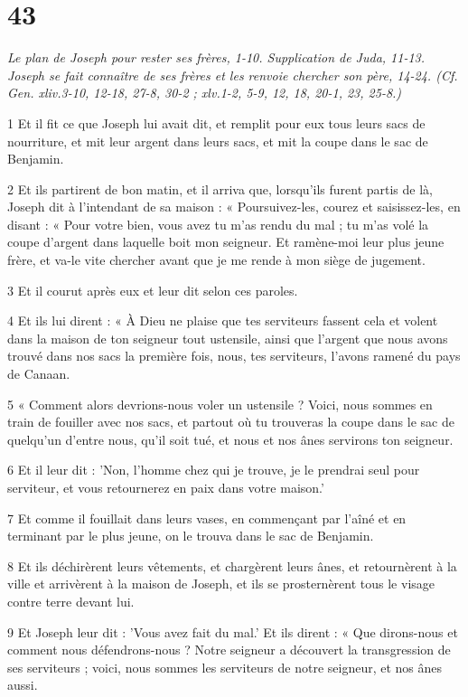 \chapter{43}

\par \textit{Le plan de Joseph pour rester ses frères, 1-10. Supplication de Juda, 11-13. Joseph se fait connaître de ses frères et les renvoie chercher son père, 14-24. (Cf. Gen. xliv.3-10, 12-18, 27-8, 30-2 ; xlv.1-2, 5-9, 12, 18, 20-1, 23, 25-8.)}

\par 1 Et il fit ce que Joseph lui avait dit, et remplit pour eux tous leurs sacs de nourriture, et mit leur argent dans leurs sacs, et mit la coupe dans le sac de Benjamin.
\par 2 Et ils partirent de bon matin, et il arriva que, lorsqu'ils furent partis de là, Joseph dit à l'intendant de sa maison : « Poursuivez-les, courez et saisissez-les, en disant : « Pour votre bien, vous avez tu m'as rendu du mal ; tu m'as volé la coupe d'argent dans laquelle boit mon seigneur. Et ramène-moi leur plus jeune frère, et va-le vite chercher avant que je me rende à mon siège de jugement.
\par 3 Et il courut après eux et leur dit selon ces paroles.
\par 4 Et ils lui dirent : « À Dieu ne plaise que tes serviteurs fassent cela et volent dans la maison de ton seigneur tout ustensile, ainsi que l'argent que nous avons trouvé dans nos sacs la première fois, nous, tes serviteurs, l'avons ramené du pays de Canaan.
\par 5 « Comment alors devrions-nous voler un ustensile ? Voici, nous sommes en train de fouiller avec nos sacs, et partout où tu trouveras la coupe dans le sac de quelqu'un d'entre nous, qu'il soit tué, et nous et nos ânes servirons ton seigneur.
\par 6 Et il leur dit : 'Non, l'homme chez qui je trouve, je le prendrai seul pour serviteur, et vous retournerez en paix dans votre maison.'
\par 7 Et comme il fouillait dans leurs vases, en commençant par l'aîné et en terminant par le plus jeune, on le trouva dans le sac de Benjamin.
\par 8 Et ils déchirèrent leurs vêtements, et chargèrent leurs ânes, et retournèrent à la ville et arrivèrent à la maison de Joseph, et ils se prosternèrent tous le visage contre terre devant lui.
\par 9 Et Joseph leur dit : 'Vous avez fait du mal.' Et ils dirent : « Que dirons-nous et comment nous défendrons-nous ? Notre seigneur a découvert la transgression de ses serviteurs ; voici, nous sommes les serviteurs de notre seigneur, et nos ânes aussi.
